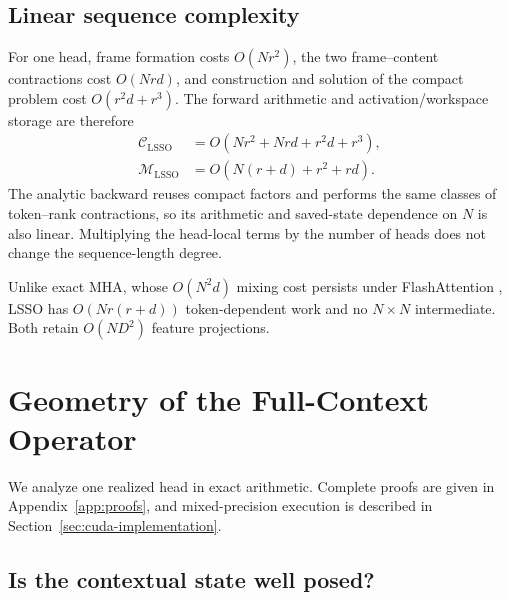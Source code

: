 \documentclass[10pt]{article}
\begin{document}
\subsection{Linear sequence complexity}
\label{sec:linear-complexity}

For one head, frame formation costs $O(Nr^2)$, the two frame--content
contractions cost $O(Nrd)$, and construction and solution of the compact
problem cost $O(r^2d+r^3)$.  The forward arithmetic and activation/workspace
storage are therefore
\begin{align}
    \mathcal C_{\mathrm{LSSO}}
        &=O\!\left(Nr^2+Nrd+r^2d+r^3\right), \\
    \mathcal M_{\mathrm{LSSO}}
        &=O\!\left(N(r+d)+r^2+rd\right).
\label{eq:lsso-complexity}
\end{align}
The analytic backward reuses compact factors and performs the same classes of
token--rank contractions, so its arithmetic and saved-state dependence on $N$
is also linear.  Multiplying the head-local terms by the number of heads does
not change the sequence-length degree.

Unlike exact MHA, whose $O(N^2d)$ mixing cost persists under FlashAttention
\cite{dao2022flashattention}, LSSO has $O(Nr(r+d))$ token-dependent work and no
$N\times N$ intermediate.  Both retain $O(ND^2)$ feature projections.

\section{Geometry of the Full-Context Operator}
\label{sec:theory}

We analyze one realized head in exact arithmetic.  Complete proofs are given in
Appendix~\ref{app:proofs}, and mixed-precision execution is described in
Section~\ref{sec:cuda-implementation}.

\subsection{Is the contextual state well posed?}
\end{document}
